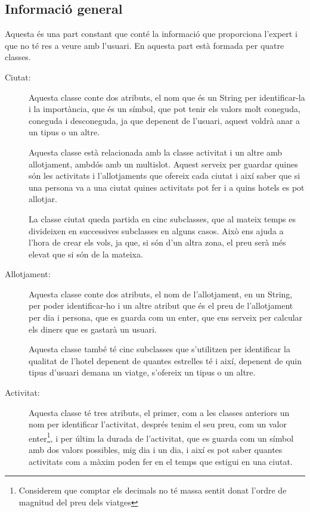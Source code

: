 \documentclass[11pt,a4paper]{article}
\begin{document}
\subsection{Informació general}
Aquesta és una part constant que conté la informació que proporciona l'expert i que no té res a veure amb l'usuari. En aquesta part està formada per quatre classes.

\begin{description}
\item[Ciutat:]Aquesta classe conte dos atributs, el nom que és un String per identificar-la i la importància, que és un símbol, que pot tenir els valors molt coneguda, coneguda i desconeguda, ja que depenent de l'usuari, aquest voldrà anar a un tipus o un altre.

Aquesta classe està relacionada amb la classe activitat i un altre amb allotjament, ambdós amb un multislot. Aquest serveix per guardar quines són les activitats i l'allotjaments que ofereix cada ciutat i així saber que si una persona va a una ciutat quines activitats pot fer i a quins hotels es pot allotjar.

La classe ciutat queda partida en cinc subclasses, que al mateix temps es divideixen en successives subclasses en alguns casos. Això ens ajuda a l'hora de crear els vols, ja que, si són d'un altra zona, el preu serà més elevat que si són de la mateixa.

\item[Allotjament:] Aquesta classe conte dos atributs, el nom de l'allotjament, en un String, per poder identificar-ho i un altre atribut que és el preu de l'allotjament per dia i persona, que es guarda com un enter, que ens serveix per calcular els diners que es gastarà un usuari.

Aquesta classe també té cinc subclasses que s'utilitzen per identificar la qualitat de l'hotel depenent de quantes estrelles té i així, depenent de quin tipus d'usuari demana un viatge, s'ofereix un tipus o un altre.

\item[Activitat:] Aquesta classe té tres atributs, el primer, com a les classes anteriors un nom per identificar l'activitat, després tenim el seu preu, com un valor enter\footnote{Considerem que comptar els decimals no té massa sentit donat l'ordre de magnitud del preu dels viatges}, i per últim la durada de l'activitat, que es guarda com un símbol amb dos valors possibles, mig dia i un dia, i així es pot saber quantes activitats com a màxim poden fer en el temps que estigui en una ciutat.


\end{description}
\end{document}
